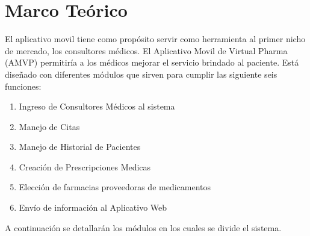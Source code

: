 \section*{Marco Teórico}\label{sec:Marco Teórico}

El aplicativo movil tiene como propósito servir como herramienta al primer nicho de mercado, los consultores médicos. El Aplicativo Movil de Virtual Pharma (AMVP) permitiría a los médicos mejorar el servicio brindado al paciente.  Está diseñado con diferentes módulos que sirven para cumplir las siguiente seis funciones:
\begin{enumerate}
\item Ingreso de Consultores Médicos al sistema
\item Manejo de Citas
\item Manejo de Historial de Pacientes
\item Creación de Prescripciones Medicas
\item Elección de farmacias proveedoras de medicamentos
\item Envío de información al Aplicativo Web
\end{enumerate}
A continuación se detallarán los módulos en los cuales se divide el sistema.